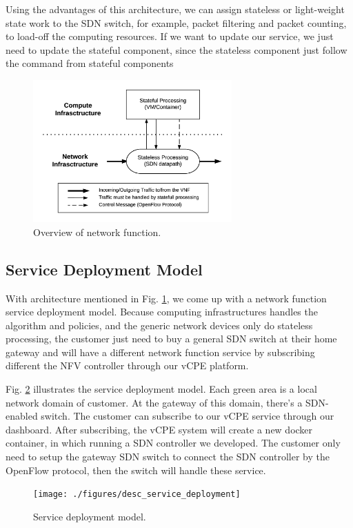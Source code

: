 \documentclass[journal]{IEEEtran}
\begin{document}
Using the advantages of this architecture, we can assign stateless or light-weight state work to the SDN switch, for example, packet filtering and packet counting, to load-off the computing resources. If we want to update our service, we just need to update the stateful component, since the stateless component just follow the command from stateful components

\begin{figure}[!t]
\centering
\includegraphics[width=3in]{./figures/desc_nfv_overview}
\caption{Overview of network function.}
\label{fig:desc_nfv_overview}
\end{figure}



\subsection{Service Deployment Model}
With architecture mentioned in Fig. \ref{fig:desc_nfv_overview}, we come up with a network function service deployment model. Because computing infrastructures handles the algorithm and policies, and the generic network devices only do stateless processing, the customer just need to buy a general SDN switch at their home gateway and will have a different network function service by subscribing different the NFV controller through our vCPE platform.

Fig. \ref{fig:desc_service_deployment} illustrates the service deployment model. Each green area is a local network domain of customer. At the gateway of this domain, there’s a SDN-enabled switch. The customer can subscribe to our vCPE service through our dashboard. After subscribing, the vCPE system will create a new docker container, in which running a SDN controller we developed. The customer only need to setup the gateway SDN switch to connect the SDN controller by the OpenFlow protocol, then the switch will handle these service.

\begin{figure}[!t]
\centering
\texttt{[image: ./figures/desc\_service\_deployment]}
\caption{Service deployment model.}
\label{fig:desc_service_deployment}
\end{figure}
\end{document}
